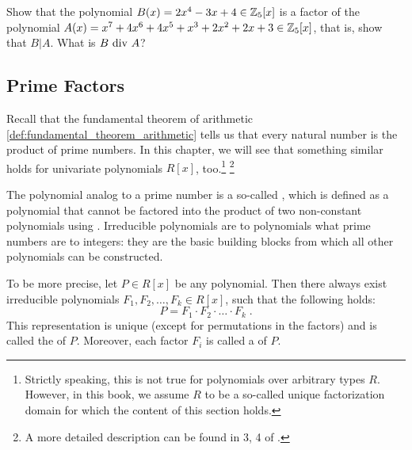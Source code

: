 \begin{exercise}
Show that the polynomial $B(x)= 2x^4-3x+4\in \mathbb{Z}_5[x]$ is a factor of the polynomial $A(x)=x^7 + 4x^6 + 4x^5 + x^3 + 2x^2 + 2x + 3\in\mathbb{Z}_5[x]$, that is, show that $B|A$. What is $B \text{ div } A$?
\end{exercise}
\subsection{Prime Factors} Recall that the fundamental theorem of arithmetic \ref{def:fundamental_theorem_arithmetic} tells us that every natural number is the product of prime numbers. In this chapter, we will see that something similar holds for univariate polynomials $R[x]$, too.\footnote{Strictly speaking, this is not true for polynomials over arbitrary types $R$. However, in this book, we assume $R$ to be a so-called unique factorization domain for which the content of this section holds.}
\footnote{A more detailed description can be found in \chaptname{} 3, \secname{} 4 of \cite{mignotte-1992}.}


The polynomial analog to a prime number is a so-called , which is defined as a polynomial that cannot be factored into the product of two non-constant polynomials using . Irreducible polynomials are to polynomials what prime numbers are to integers: they are the basic building blocks from which all other polynomials can be constructed. 

To be more precise, let $P \in R[x]$ be any polynomial. Then there always exist irreducible polynomials $F_1, F_2, \ldots, F_k \in R[x]$, such that the following holds:
\begin{equation}
\label{def_polynomial_prime_factorization}
P = F_1 \cdot F_2 \cdot \ldots \cdot F_k \;.
\end{equation}
This representation is unique (except for permutations in the factors) and is called the  of $P$. Moreover, each factor $F_i$ is called a  of $P$.

